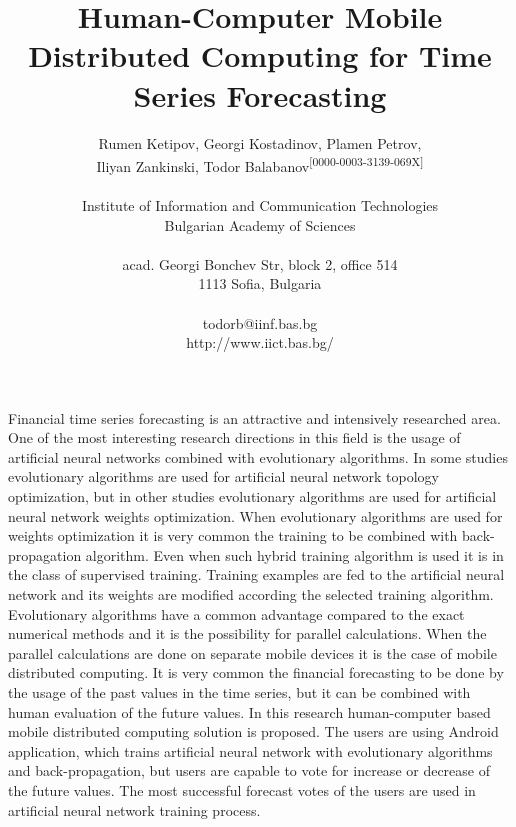 \documentclass[12pt,a4paper]{article}
\title{\bf Human-Computer Mobile Distributed Computing for Time Series Forecasting}
\author{Rumen Ketipov, Georgi Kostadinov, Plamen Petrov, \\
Iliyan Zankinski, Todor Balabanov\textsuperscript{[0000-0003-3139-069X]} \\
\\
Institute of Information and Communication Technologies \\
Bulgarian Academy of Sciences \\
\\
acad. Georgi Bonchev Str, block 2, office 514 \\
1113 Sofia, Bulgaria \\
\\
todorb@iinf.bas.bg \\
http://www.iict.bas.bg/}
\date{}
\begin{document}
\maketitle

Financial time series forecasting is an attractive and intensively researched area. One of the most interesting research directions in this field is the usage of artificial neural networks combined with evolutionary algorithms. In some studies evolutionary algorithms are used for artificial neural network topology optimization, but in other studies evolutionary algorithms are used for artificial neural network weights optimization. When evolutionary algorithms are used for weights optimization it is very common the training to be combined with back-propagation algorithm. Even when such hybrid training algorithm is used it is in the class of supervised training. Training examples are fed to the artificial neural network and its weights are modified according the selected training algorithm. Evolutionary algorithms have a common advantage compared to the exact numerical methods and it is the possibility for parallel calculations. When the parallel calculations are done on separate mobile devices it is the case of mobile distributed computing. It is very common the financial forecasting to be done by the usage of the past values in the time series, but it can be combined with human evaluation of the future values. In this research human-computer based mobile distributed computing solution is proposed. The users are using Android application, which trains artificial neural network with evolutionary algorithms and back-propagation, but users are capable to vote for increase or decrease of the future values. The most successful forecast votes of the users are used in artificial neural network training process.
\end{document}
